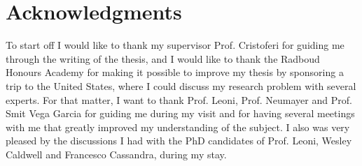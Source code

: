 \documentclass[artcle, 11pt, reqno]{amsart}
\numberwithin{equation}{section}
\theoremstyle{plain}
\theoremstyle{definition}
\theoremstyle{remark}
\begin{document}
	
	
	
	\section*{Acknowledgments}
	To start off I would like to thank my supervisor Prof. Cristoferi for guiding me through the writing of the thesis, and I would like to thank the Radboud Honours Academy for making it possible to improve my thesis
	by sponsoring a trip to the United States, where I could discuss my research problem with several
	experts. For that matter, I want to thank Prof. Leoni, Prof. Neumayer and Prof. Smit Vega Garcia
	for guiding me during my visit and for having several meetings with me that greatly improved
	my understanding of the subject. I also was very pleased by the discussions I had with the PhD
	candidates of Prof. Leoni, Wesley Caldwell and Francesco Cassandra, during my stay.
	
	
	
	
	
\end{document}
